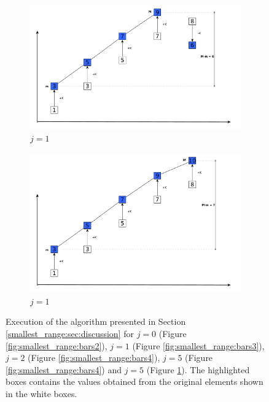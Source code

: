 \begin{figure}\ContinuedFloat
	\begin{subfigure}[t]{0.99\textwidth}
		\centering
		\includegraphics[width=1\linewidth]{sources/smallest_range/images/bars5}
		\caption{$j=1$}
		\label{fig:smallest_range:bars5}
	\end{subfigure}

	\medskip
	\begin{subfigure}[t]{0.99\textwidth}
		\centering
		\includegraphics[width=1\linewidth]{sources/smallest_range/images/bars6}
		\caption{$j=1$}
		\label{fig:smallest_range:bars6}
	\end{subfigure}

	\caption{Execution of the algorithm presented in Section \ref{smallest_range:sec:discussion}
	for $j=0$ (Figure \ref{fig:smallest_range:bars2}),  $j=1$ (Figure \ref{fig:smallest_range:bars3}),
	$j=2$ (Figure \ref{fig:smallest_range:bars4}), $j=5$ (Figure \ref{fig:smallest_range:bars4}) 
	and $j=5$ (Figure \ref{fig:smallest_range:bars5}).
	The highlighted boxes contains the values obtained from the original elements
	shown in the white boxes.}
	\label{fig:smallest_range:bars_execution}
\end{figure}